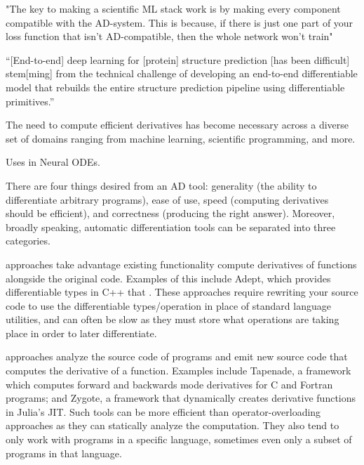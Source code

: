 "The key to making a scientific ML stack work is by making every component compatible with the AD-system. This is because, if there is just one part of your loss function that isn't AD-compatible, then the whole network won't train" \cite{10.15200/winn.156631.13064}



``[End-to-end] deep learning for [protein] structure prediction [has been difficult] stem[ming] from the technical challenge of developing an end-to-end differentiable model that rebuilds the entire structure prediction pipeline using differentiable primitives.'' \cite{alquraishi2019end}


The need to compute efficient derivatives has become necessary across a diverse set of domains ranging from machine learning, scientific programming, and more. 

Uses in Neural ODEs\cite{chen2018neural}.

There are four things desired from an AD tool: generality (the ability to differentiate arbitrary programs), ease of use, speed (computing derivatives should be efficient), and correctness (producing the right answer). Moreover, broadly speaking, automatic differentiation tools can be separated into three categories.

 approaches take advantage existing functionality compute derivatives of functions alongside the original code. Examples of this include Adept\cite{adept}, which provides differentiable types in C++ that . These approaches require rewriting your source code to use the differentiable types/operation in place of standard language utilities, and can often be slow as they must store what operations are taking place in order to later differentiate.

 approaches analyze the source code of programs and emit new source code that computes the derivative of a function. Examples include Tapenade\cite{TapenadeRef13}, a framework which computes forward and backwards mode derivatives for C and Fortran programs; and Zygote\cite{zygoteArxiv,zygoteDP,zygoteMlsys}, a framework that dynamically creates derivative functions in Julia's JIT. Such tools can be more efficient than operator-overloading approaches as they can statically analyze the computation. They also tend to only work with programs in a specific language, sometimes even only a subset of programs in that language.

